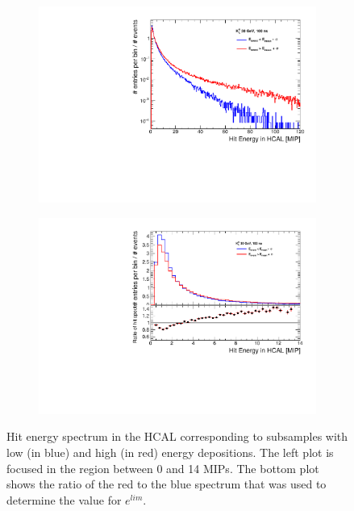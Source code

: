 \begin{figure}[htbp!]
  \centering
  \begin{subfigure}[t]{0.49\textwidth}
    \centering
    \includegraphics[width=1\linewidth]{../Thesis_Plots/ILD/AdditionalPlots/Plots/HitEnergySpectra_100ns_30GeV.pdf}
    \caption{} \label{fig:HitSpectra30_100ns}
  \end{subfigure}
  \hfill
  \begin{subfigure}[t]{0.49\textwidth}
    \centering
    \includegraphics[width=1\linewidth]{../Thesis_Plots/ILD/AdditionalPlots/Plots/HitEnergySpectra_Zoom_100ns_30GeV.pdf}
    \caption{} \label{fig:HitSpectra30_Zoom_100ns}
  \end{subfigure}
  \caption{Hit energy spectrum in the HCAL corresponding to subsamples with low (in blue) and high (in red) energy depositions. The left plot is focused in the region between 0 and 14 MIPs. The bottom plot shows the ratio of the red to the blue spectrum that was used to determine the value for $e^{lim}$.} \label{fig:Response30GeV}
\end{figure}

